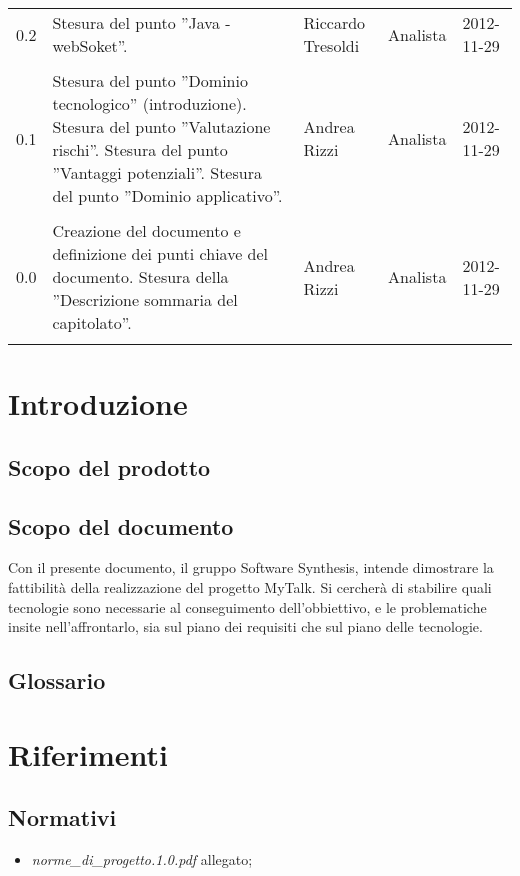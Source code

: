 \begin{longtable}{lp{}lll}
0.2 & Stesura del punto ''Java - webSoket''.  & Riccardo Tresoldi &Analista& 2012-11-29\\\\
0.1 & Stesura del punto ''Dominio tecnologico'' (introduzione). Stesura del punto ''Valutazione rischi''. Stesura del punto ''Vantaggi potenziali''. Stesura del punto ''Dominio applicativo''.  & Andrea Rizzi &Analista& 2012-11-29\\\\
0.0 & Creazione del documento e definizione dei punti chiave del documento. Stesura della ''Descrizione sommaria del capitolato''. & Andrea Rizzi & Analista&2012-11-29\\\\
\bottomrule
\end{longtable}
\newpage



\setcounter{page}{1}
\pagestyle{normal}


\section{Introduzione}
\subsection{Scopo del prodotto}
\purpose
\subsection{Scopo del documento}
Con il presente documento, il gruppo Software Synthesis, intende dimostrare la fattibilità della realizzazione del progetto MyTalk. Si cercherà di stabilire quali tecnologie sono necessarie al conseguimento dell'obbiettivo, e le problematiche insite nell'affrontarlo, sia sul piano dei requisiti che sul piano delle tecnologie.
\subsection{Glossario}
\glossaryIntro
\clearpage

\section{Riferimenti}
\subsection{Normativi}
\begin{itemize}
\item[] \textit{norme\_di\_progetto.1.0.pdf} allegato;
\end{itemize}
